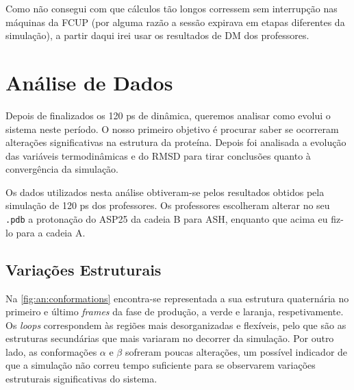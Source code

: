 \documentclass[12pt,a4paper]{article}
\begin{document}
	Como não consegui com que cálculos tão longos corressem sem interrupção nas máquinas da FCUP (por alguma razão a sessão expirava em etapas diferentes da simulação), a partir daqui irei usar os resultados de DM dos professores.
	
\section{Análise de Dados}
	Depois de finalizados os 120 ps de dinâmica, queremos analisar como evolui o sistema neste período. O nosso primeiro objetivo é procurar saber se ocorreram alterações significativas na estrutura da proteína. Depois foi analisada a evolução das variáveis termodinâmicas e do RMSD para tirar conclusões quanto à convergência da simulação.
	
	Os dados utilizados nesta análise obtiveram-se pelos resultados obtidos pela simulação de 120 ps dos professores. Os professores escolheram alterar no seu \verb|.pdb| a protonação do ASP25 da cadeia B para ASH, enquanto que acima eu fiz-lo para a cadeia A.
	
\subsection{Variações Estruturais}\label{sec:variacoes-estruturais}
	Na \cref{fig:an:conformations} encontra-se representada a sua estrutura quaternária no primeiro e último \textit{frames} da fase de produção, a verde e laranja, respetivamente. Os \textit{loops} correspondem às regiões mais desorganizadas e flexíveis, pelo que são as estruturas secundárias que mais variaram no decorrer da simulação. Por outro lado, as conformações $\alpha$ e $\beta$ sofreram poucas alterações, um possível indicador de que a simulação não correu tempo suficiente para se observarem variações estruturais significativas do sistema.
	
\end{document}

